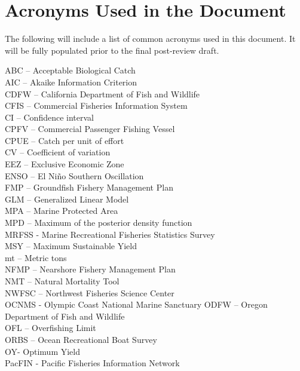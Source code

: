 \documentclass[11pt,
  english,
  letterpaper,
]{article}
\begin{document}
\newpage

\hypertarget{acronyms-used-in-the-document}{%
\section*{Acronyms Used in the Document}\label{acronyms-used-in-the-document}}

The following will include a list of common acronyms used in this document. It will be fully populated prior to the final post-review draft.

ABC -- Acceptable Biological Catch\\
AIC -- Akaike Information Criterion\\
CDFW -- California Department of Fish and Wildlife\\
CFIS -- Commercial Fisheries Information System\\
CI -- Confidence interval\\
CPFV -- Commercial Passenger Fishing Vessel\\
CPUE -- Catch per unit of effort\\
CV -- Coefficient of variation\\
EEZ -- Exclusive Economic Zone\\
ENSO -- El Niño Southern Oscillation\\
FMP -- Groundfish Fishery Management Plan\\
GLM -- Generalized Linear Model\\
MPA -- Marine Protected Area\\
MPD -- Maximum of the posterior density function\\
MRFSS - Marine Recreational Fisheries Statistics Survey\\
MSY -- Maximum Sustainable Yield\\
mt -- Metric tons\\
NFMP -- Nearshore Fishery Management Plan\\
NMT -- Natural Mortality Tool\\
NWFSC -- Northwest Fisheries Science Center\\
OCNMS - Olympic Coast National Marine Sanctuary ODFW -- Oregon Department of Fish and Wildlife\\
OFL -- Overfishing Limit\\
ORBS -- Ocean Recreational Boat Survey\\
OY- Optimum Yield\\
PacFIN - Pacific Fisheries Information Network\\
\end{document}
